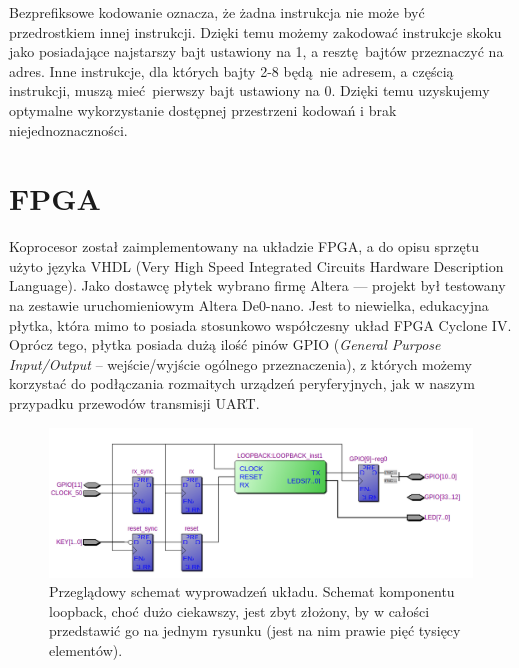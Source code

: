 Bezprefiksowe kodowanie oznacza, że żadna instrukcja nie może być przedrostkiem innej instrukcji. Dzięki temu możemy zakodować instrukcje skoku jako posiadające najstarszy bajt ustawiony na 1, a resztę bajtów przeznaczyć na adres. Inne instrukcje, dla których bajty 2-8 będą nie adresem, a częścią instrukcji, muszą mieć pierwszy bajt ustawiony na 0. Dzięki temu uzyskujemy optymalne wykorzystanie dostępnej przestrzeni kodowań i brak niejednoznaczności.

\section{FPGA}

Koprocesor został zaimplementowany na układzie FPGA, a do opisu sprzętu użyto języka VHDL (Very High Speed Integrated Circuits Hardware Description Language). Jako dostawcę płytek wybrano firmę Altera --- projekt był testowany na zestawie uruchomieniowym Altera De0-nano. Jest to niewielka, edukacyjna płytka, która mimo to posiada stosunkowo współczesny układ FPGA Cyclone IV. Oprócz tego, płytka posiada dużą ilość pinów GPIO (\textit{General Purpose Input/Output} -- wejście/wyjście ogólnego przeznaczenia), z których możemy korzystać do podłączania rozmaitych urządzeń peryferyjnych, jak w naszym przypadku przewodów transmisji UART.

\begin{figure}
  \begin{center}
    \includegraphics[scale=0.5]{images/schemat.png}
    \caption{Przeglądowy schemat wyprowadzeń układu. Schemat komponentu loopback, choć dużo ciekawszy, jest zbyt złożony, by w całości przedstawić go na jednym rysunku (jest na nim prawie pięć tysięcy elementów).}
    \label{fig:schemat}
  \end{center}
\end{figure}

